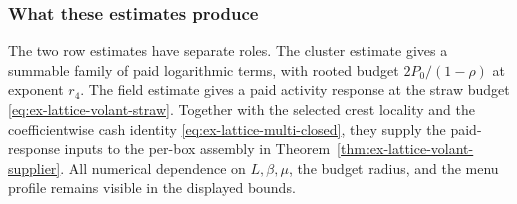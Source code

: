 \subsubsection{What these estimates produce}

The two row estimates have separate roles. The cluster estimate gives a
summable family of paid logarithmic terms, with rooted budget
$2P_0/(1-\rho)$ at exponent $r_4$. The field estimate gives a paid
activity response at the straw budget \eqref{eq:ex-lattice-volant-straw}.
Together with the selected crest locality and the coefficientwise cash
identity \eqref{eq:ex-lattice-multi-closed}, they supply the paid-response
inputs to the per-box assembly in
Theorem~\ref{thm:ex-lattice-volant-supplier}. All numerical dependence on
$L,\beta,\mu$, the budget radius, and the menu profile remains visible in
the displayed bounds.
